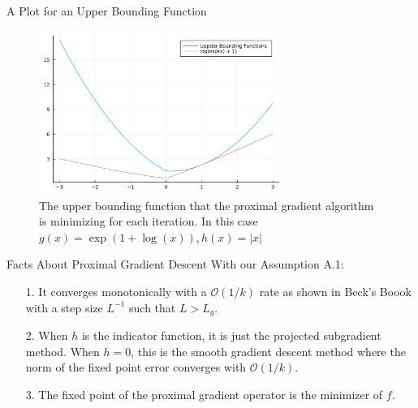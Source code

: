 \documentclass[11pt]{beamer}
\begin{document}
        \begin{frame}{A Plot for an Upper Bounding Function}
            \begin{figure}[h]
                \centering
                \includegraphics[width=8cm]{the_upperbounding_fxn.png}
                \caption{The upper bounding function that the proximal gradient algorithm is minimizing for each iteration. In this case $g(x) = \exp(1 + \log(x)), h(x) = |x|$}
            \end{figure}

        \end{frame}
        \begin{frame}{Facts About Proximal Gradient Descent}
            With our Assumption A.1: 
            \begin{itemize}
                \item [1.] It converges monotonically with a $\mathcal O(1/k)$ rate as shown in Beck's Boook\cite{book:first_order_opt} with a step size $L^{-1}$ such that $L > L_g$. 
                \item [2.] When $h$ is the indicator function, it is just the projected subgradient method. When $h = 0$, this is the smooth gradient descent method where the norm of the fixed point error converges with $\mathcal O(1/k)$\cite{book:first_order_opt}. 
                \item [3.] The fixed point of the proximal gradient operator is the minimizer of $f$. 
            \end{itemize}
        \end{frame}
\end{document}
